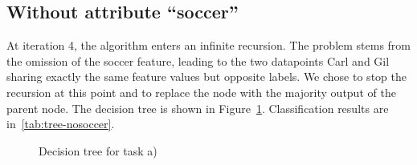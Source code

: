 
\subsection{Without attribute ``soccer''}

At iteration 4, the algorithm enters an infinite recursion.
The problem stems from the omission of the soccer feature,
leading to the two datapoints Carl and Gil sharing exactly the same feature values but opposite labels.
We chose to stop the recursion at this point and to replace the node with the majority output of the parent node.
The decision tree is shown in Figure~\ref{fig:tree-nosoccer}.
Classification results are in~\ref{tab:tree-nosoccer}.

\begin{figure}[h!]
\centering 
{}
\caption{Decision tree for task a)}
\label{fig:tree-nosoccer}
\end{figure}

